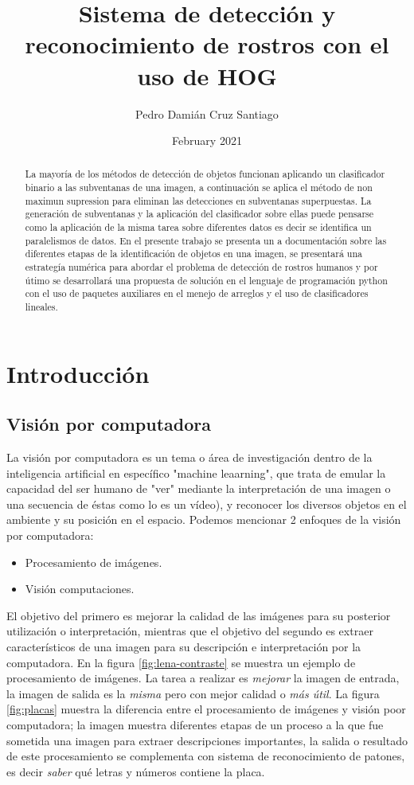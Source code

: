 \documentclass{article}
\title{Sistema de detección y reconocimiento de rostros con el uso de HOG }
\author{Pedro Damián Cruz Santiago}
\date{February 2021}
\begin{document}
\maketitle

\begin{abstract}
La mayoría de los métodos de detección de objetos funcionan aplicando un clasificador binario a las subventanas de una imagen, a continuación se aplica el método de non maximun supression para eliminan las detecciones en subventanas superpuestas. La generación de subventanas y la aplicación del clasificador sobre ellas puede pensarse como la aplicación de la misma tarea sobre diferentes datos es decir se identifica un paralelismos de datos. En el presente trabajo se presenta un a documentación sobre las diferentes etapas de la identificación de objetos en una imagen, se presentará una estrategía numérica para abordar el problema de detección de rostros humanos y por útimo se desarrollará una propuesta de solución en el lenguaje de programación python con el uso de paquetes auxiliares en el menejo de arreglos y el uso de clasificadores lineales.


\end{abstract}

\section*{Introducción}
\subsection*{Visión por computadora}
La visión por computadora es un tema o área de investigación  dentro de la inteligencia artificial en específico "machine leaarning", que trata de emular la capacidad del ser humano de  "ver" mediante la interpretación de una imagen o una secuencia de éstas como lo es un
vídeo), y reconocer los diversos objetos en el ambiente y su posición en el espacio.  Podemos mencionar 2 enfoques de la visión por computadora:
\begin{itemize}
  \item Procesamiento de imágenes.
  \item Visión computaciones.
\end{itemize}
El objetivo del primero es mejorar la calidad de las imágenes para su posterior utilización o interpretación, mientras que el objetivo del segundo es extraer característicos de una imagen para su descripción e interpretación por la computadora. 
En la figura \ref{fig:lena-contraste} se muestra un ejemplo de procesamiento de imágenes. La tarea a realizar es \textit{mejorar} la imagen de entrada, la imagen de salida es la \textit{misma} pero con mejor calidad o \textit{más útil}. La figura \ref{fig:placas} muestra la diferencia entre el procesamiento de imágenes y visión poor computadora; la imagen muestra diferentes etapas de un proceso a la que fue sometida una imagen para extraer descripciones importantes, la salida o resultado de este procesamiento se complementa con sistema de reconocimiento de patones, es decir \textit{saber} qué letras y números contiene la placa\cite{placas}.
\end{document}
